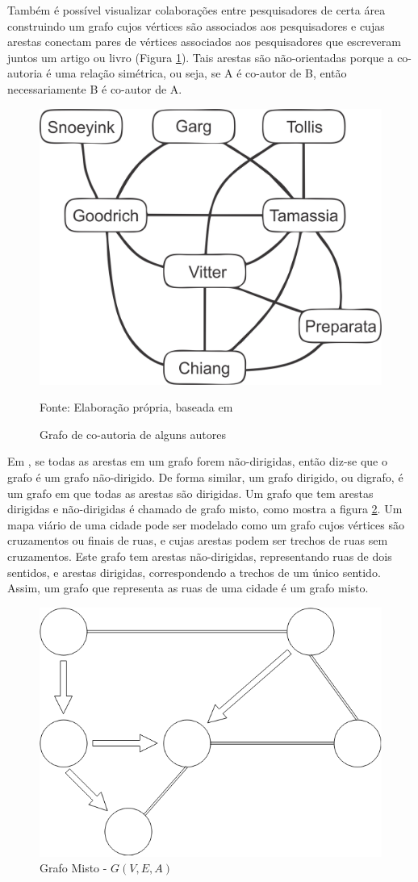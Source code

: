 Também é possível visualizar colaborações entre pesquisadores de certa área construindo um grafo cujos vértices são
associados aos pesquisadores e cujas arestas conectam pares de vértices associados aos pesquisadores
que escreveram juntos um artigo ou livro (Figura \ref{fig:goodrich}). Tais arestas são não-orientadas porque
a co-autoria é uma relação simétrica, ou seja, se A é co-autor de B, então necessariamente B é co-autor de A.

\begin{figure}[htbp]
\centering
 \includegraphics[width=.35\textwidth]{figuras/goodrich.png}
\caption{Grafo de co-autoria de alguns autores}
Fonte: Elaboração própria, baseada em \cite{goodrich}
\label{fig:goodrich}
\end{figure}
\FloatBarrier


Em \cite{goodrich}, se todas as arestas em um grafo forem não-dirigidas,
então diz-se que o grafo é um grafo não-dirigido. De forma similar, um grafo dirigido, ou digrafo, é um grafo em
que todas as arestas são dirigidas. Um grafo que tem arestas dirigidas e não-dirigidas é chamado de grafo misto, 
como mostra a figura \ref{fig:misto}.
Um mapa viário de uma cidade pode ser modelado como um grafo cujos vértices são cruzamentos ou finais de ruas, e cujas arestas
podem ser trechos de ruas sem cruzamentos. Este grafo tem arestas não-dirigidas, representando ruas de dois sentidos,
e arestas dirigidas, correspondendo a trechos de um único sentido. Assim, um grafo que representa as ruas de uma cidade
é um grafo misto.

\begin{figure}[htbp]
\centering
 \includegraphics[width=.35\textwidth]{figuras/misto1.png}
\caption{Grafo Misto - $G(V,E,A)$}
\label{fig:misto}
\end{figure}

